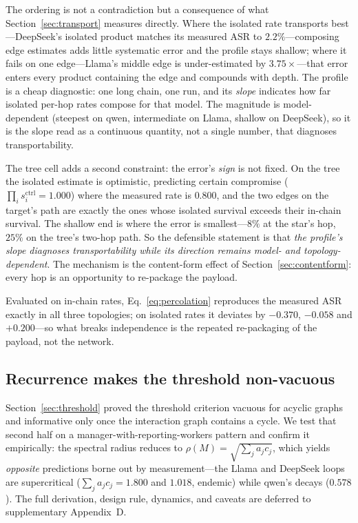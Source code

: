 \documentclass[sigconf,anonymous]{aamas}
\newcommand{\scite}[1]{\ensuremath{s^{\mathrm{ctrl}}_{#1}}}
\begin{document}
The ordering is not a contradiction but a consequence of what
Section~\ref{sec:transport} measures directly. Where the isolated rate transports
best---DeepSeek's isolated product matches its measured ASR to $2.2\%$---composing
edge estimates adds little systematic error and the profile stays shallow; where it
fails on one edge---Llama's middle edge is under-estimated by $3.75\times$---that
error enters every product containing the edge and compounds with depth. The profile
is a cheap diagnostic: one long chain, one run, and its \emph{slope} indicates how far
isolated per-hop rates compose for that model. The magnitude is model-dependent
(steepest on qwen, intermediate on Llama, shallow on DeepSeek), so it is the slope
read as a continuous quantity, not a single number, that diagnoses transportability.

The tree cell adds a second constraint: the error's \emph{sign} is not fixed. On
the tree the isolated estimate is optimistic, predicting certain compromise
($\prod_i \scite{i} = 1.000$) where the measured rate is $0.800$, and the two edges
on the target's path are exactly the ones whose isolated survival exceeds their
in-chain survival. The shallow end is where the error is smallest---$8\%$ at the
star's hop, $25\%$ on the tree's two-hop path. So the defensible statement is that
\emph{the profile's slope diagnoses transportability while its direction remains
model- and topology-dependent}. The mechanism is the content-form effect of
Section~\ref{sec:contentform}: every hop is an opportunity to re-package the payload.

Evaluated on in-chain rates, Eq.~\eqref{eq:percolation} reproduces the measured ASR
exactly in all three topologies; on isolated rates it deviates by $-0.370$, $-0.058$
and $+0.200$---so what breaks independence is the repeated re-packaging of the
payload, not the network.

\subsection{Recurrence makes the threshold non-vacuous}
\label{sec:cyclic}

Section~\ref{sec:threshold} proved the threshold criterion vacuous for acyclic graphs
and informative only once the interaction graph contains a cycle. We test that second
half on a manager-with-reporting-workers pattern and confirm it empirically: the
spectral radius reduces to $\rho(M) = \sqrt{\sum_j a_j c_j}$, which yields
\emph{opposite} predictions borne out by measurement---the Llama and DeepSeek loops
are supercritical ($\sum_j a_jc_j = 1.800$ and $1.018$, endemic) while qwen's decays
($0.578$). The full derivation,
design rule, dynamics, and caveats are deferred to supplementary Appendix~D.
\end{document}

